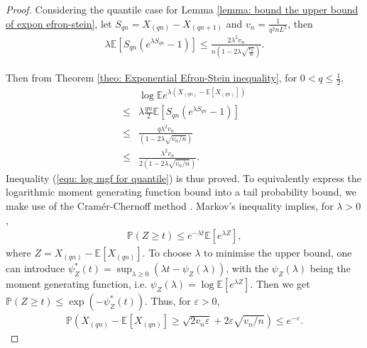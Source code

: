 \BernQuant*

\begin{proof}
Considering the quantile case for Lemma \ref{lemma: bound the upper bound of expon efron-stein}, let $S_{qn} = X_{(qn)} - X_{(qn + 1)}$ and $v_n = \frac{1}{q^2 n L^2}$, then
\begin{align}
    \lambda\mathbb{E}\left[S_{qn}\left(e^{\lambda S_{qn}}-1\right)\right] \leq  \frac{2\lambda^2 v_n}{n \left(1 - 2 \lambda \sqrt{\frac{v_n}{n}}\right)}.
\end{align}{}


Then from Theorem \ref{theo: Exponential Efron-Stein inequality}, for $0 < q \leq \frac{1}{2}$,
\begin{align}
    & \log \mathbb{E} e^{\lambda\left(X_{\left(qn\right)}-\mathbb{E}[X_{\left(qn\right)}] \right)} \nonumber \\
    \leq& \lambda \frac{qn}{2} \mathbb{E}\left[S_{qn}\left(e^{\lambda S_{qn}}-1\right)\right]\\
    \leq&
    \frac{q \lambda^{2} v_{n}}{\left(1-2 \lambda \sqrt{v_{n} / n}\right)}\\
    \leq&
    \frac{ \lambda^{2} v_{n}}{2 \left(1-2 \lambda \sqrt{v_{n} / n}\right)}.
\end{align}
Inequality (\ref{equ: log mgf for quantile}) is thus proved. 
To equivalently express the logarithmic moment generating function bound into a tail probability bound, we make use of the Cram\'er-Chernoff method \cite{boucheron2013}. Markov's inequality implies, for $\lambda > 0$,
\begin{align}
    \mathbb{P}(Z \geq t) \leq e^{-\lambda t} \mathbb{E}[e^{\lambda Z}],
\end{align}
where $Z = X_{\left(qn\right)}-\mathbb{E}[X_{\left(qn\right)}]$. To choose $\lambda$ to minimise the upper bound, one can introduce $\psi_{Z}^{*}(t)=\sup _{\lambda \geq 0}\left(\lambda t-\psi_{Z}(\lambda)\right)$, with the $\psi_{Z}(\lambda)$ being the moment generating function, i.e. $\psi_{Z}(\lambda)=\log \mathbb{E}[e^{\lambda Z}]$. Then we get $\mathbb{P}(Z \geq t) \leq \exp \left(-\psi_{Z}^{*}(t)\right)$. Thus, for $\varepsilon > 0$,
\begin{align}
    \mathbb{P}\left(X_{\left(qn\right)}-\mathbb{E}[X_{\left(qn\right)}] \geq \sqrt{2 v_{n} \varepsilon}+2 \varepsilon \sqrt{v_{n} / n}\right) \leq e^{-\varepsilon}.
\end{align}

\end{proof}

